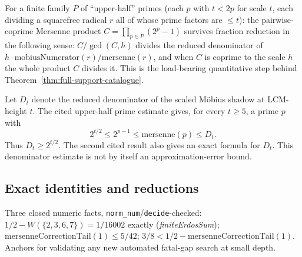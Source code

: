 \begin{thm}
\label{thm:mersenne-channel-survival}
For a finite family $P$ of ``upper-half'' primes (each $p$ with $t<2p$ for scale $t$,
each dividing a squarefree radical $r$ all of whose prime factors are $\le t$): the
pairwise-coprime Mersenne product $C=\prod_{p\in P}(2^p-1)$ survives fraction reduction in the
following sense: $C/\gcd(C,h)$ divides the reduced denominator of
$h\cdot\mathrm{mobiusNumerator}(r)/\mathrm{mersenne}(r)$, and when $C$ is coprime to the scale $h$
the whole product $C$ divides it. This is the load-bearing quantitative step behind
Theorem~\ref{thm:full-support-catalogue}.
\par{}
\end{thm}

\begin{thm}
\label{thm:mersenne-channel-growth}
Let $D_t$ denote the reduced denominator of the scaled M\"obius shadow
at LCM-height $t$.  The cited upper-half prime estimate gives, for every
$t\ge5$, a prime $p$ with
\[
 2^{t/2}\le 2^{p-1}\le\mathrm{mersenne}(p)\le D_t.
\]
Thus $D_t\ge2^{t/2}$.  The second cited result also gives an exact formula
for $D_t$.  This denominator estimate is not by itself an approximation-error
bound.
\par{}
\end{thm}

\subsection{Exact identities and reductions}

\begin{obs}
\label{obs:half-regression}
Three closed numeric facts, \texttt{norm\_num}/\texttt{decide}-checked: $1/2 -
W(\{2,3,6,7\}) = 1/16002$ exactly (\emph{finiteErdosSum}); $\mathrm{mersenneCorrectionTail}(1)
\le 5/42$; $3/8 < 1/2 - \mathrm{mersenneCorrectionTail}(1)$. Anchors for validating any
new automated fatal-gap search at small depth.
\par{}
\end{obs}

